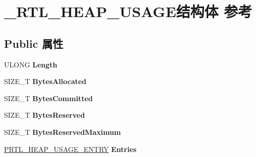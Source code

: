 \hypertarget{struct___r_t_l___h_e_a_p___u_s_a_g_e}{}\section{\+\_\+\+R\+T\+L\+\_\+\+H\+E\+A\+P\+\_\+\+U\+S\+A\+G\+E结构体 参考}
\label{struct___r_t_l___h_e_a_p___u_s_a_g_e}
\subsection*{Public 属性}
\begin{DoxyCompactItemize}
\item 
\mbox{\label{struct___r_t_l___h_e_a_p___u_s_a_g_e_ae29da4a1bb134a4387532615f352b099}} 
U\+L\+O\+NG {\bfseries Length}
\item 
\mbox{\label{struct___r_t_l___h_e_a_p___u_s_a_g_e_a210863de2f5b3743409675925fef185a}} 
S\+I\+Z\+E\+\_\+T {\bfseries Bytes\+Allocated}
\item 
\mbox{\label{struct___r_t_l___h_e_a_p___u_s_a_g_e_ad4ca8963df06891503e9f7d71d13090d}} 
S\+I\+Z\+E\+\_\+T {\bfseries Bytes\+Committed}
\item 
\mbox{\label{struct___r_t_l___h_e_a_p___u_s_a_g_e_a2e56bc785dec0a49554bb49724772a51}} 
S\+I\+Z\+E\+\_\+T {\bfseries Bytes\+Reserved}
\item 
\mbox{\label{struct___r_t_l___h_e_a_p___u_s_a_g_e_aabaef59412b6975397b16089b8638d2f}} 
S\+I\+Z\+E\+\_\+T {\bfseries Bytes\+Reserved\+Maximum}
\item 
\mbox{\label{struct___r_t_l___h_e_a_p___u_s_a_g_e_a3f3a966356d2338da5c6775385390533}} 
\hyperlink{struct___r_t_l___h_e_a_p___u_s_a_g_e___e_n_t_r_y}{P\+R\+T\+L\+\_\+\+H\+E\+A\+P\+\_\+\+U\+S\+A\+G\+E\+\_\+\+E\+N\+T\+RY} {\bfseries Entries}
\item 
\mbox{\label{struct___r_t_l___h_e_a_p___u_s_a_g_e_a585ceb2e133c21b291ff6961d1b19c89}} 

\end{DoxyCompactItemize}
